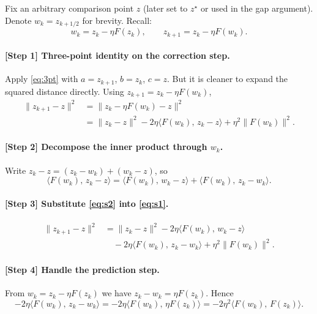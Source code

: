 \documentclass{article}
\begin{document}
Fix an arbitrary comparison point $z$ (later set to $z^\star$ or used in the
gap argument). Denote $w_k = z_{k+1/2}$ for brevity. Recall:
\[
w_k = z_k - \eta F(z_k), \qquad z_{k+1} = z_k - \eta F(w_k).
\]

\paragraph{[Step 1] Three-point identity on the correction step.}
Apply \eqref{eq:3pt} with $a=z_{k+1}$, $b=z_k$, $c=z$. But it is cleaner to
expand the squared distance directly. Using $z_{k+1}=z_k-\eta F(w_k)$,
\begin{align}
\|z_{k+1}-z\|^2
&= \|z_k - \eta F(w_k) - z\|^2 \nonumber\\
&= \|z_k - z\|^2 - 2\eta \langle F(w_k),\, z_k - z\rangle
   + \eta^2 \|F(w_k)\|^2. \label{eq:s1}
\end{align}

\paragraph{[Step 2] Decompose the inner product through $w_k$.}
Write $z_k - z = (z_k - w_k) + (w_k - z)$, so
\begin{equation}
\label{eq:s2}
\langle F(w_k),\, z_k - z\rangle
= \langle F(w_k),\, w_k - z\rangle
+ \langle F(w_k),\, z_k - w_k\rangle.
\end{equation}

\paragraph{[Step 3] Substitute \eqref{eq:s2} into \eqref{eq:s1}.}
\begin{align}
\|z_{k+1}-z\|^2
&= \|z_k - z\|^2
   - 2\eta \langle F(w_k),\, w_k - z\rangle \nonumber\\
&\quad - 2\eta \langle F(w_k),\, z_k - w_k\rangle
   + \eta^2 \|F(w_k)\|^2. \label{eq:s3}
\end{align}

\paragraph{[Step 4] Handle the prediction step.}
From $w_k = z_k - \eta F(z_k)$ we have
$z_k - w_k = \eta F(z_k)$. Hence
\begin{equation}
\label{eq:s4}
-2\eta\langle F(w_k),\, z_k - w_k\rangle
= -2\eta\langle F(w_k),\, \eta F(z_k)\rangle
= -2\eta^2 \langle F(w_k),\, F(z_k)\rangle.
\end{equation}
\end{document}
